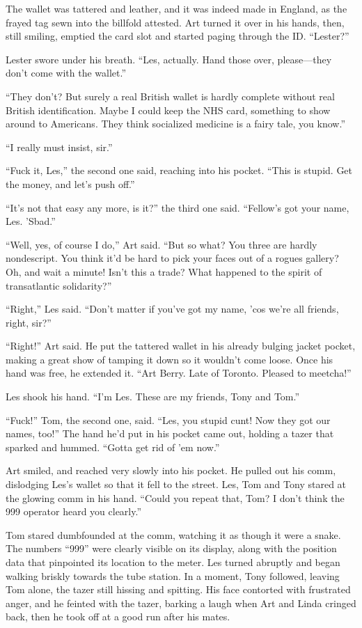 The wallet was tattered and leather, and it was indeed made in
England, as the frayed tag sewn into the billfold attested. Art
turned it over in his hands, then, still smiling, emptied the card
slot and started paging through the ID. “Lester?”

Lester swore under his breath. “Les, actually. Hand those over,
please—they don’t come with the wallet.”

“They don’t? But surely a real British wallet is hardly complete
without real British identification. Maybe I could keep the NHS
card, something to show around to Americans. They think socialized
medicine is a fairy tale, you know.”

“I really must insist, sir.”

“Fuck it, Les,” the second one said, reaching into his pocket.
“This is stupid. Get the money, and let’s push off.”

“It’s not that easy any more, is it?” the third one said. “Fellow’s
got your name, Les. ’Sbad.”

“Well, yes, of course I do,” Art said. “But so what? You three are
hardly nondescript. You think it’d be hard to pick your faces out
of a rogues gallery? Oh, and wait a minute! Isn’t this a trade?
What happened to the spirit of transatlantic solidarity?”

“Right,” Les said. “Don’t matter if you’ve got my name, ’cos we’re
all friends, right, sir?”

“Right!” Art said. He put the tattered wallet in his already
bulging jacket pocket, making a great show of tamping it down so it
wouldn’t come loose. Once his hand was free, he extended it. “Art
Berry. Late of Toronto. Pleased to meetcha!”

Les shook his hand. “I’m Les. These are my friends, Tony and Tom.”

“Fuck!” Tom, the second one, said. “Les, you stupid cunt! Now they
got our names, too!” The hand he’d put in his pocket came out,
holding a tazer that sparked and hummed. “Gotta get rid of ’em
now.”

Art smiled, and reached very slowly into his pocket. He pulled out
his comm, dislodging Les’s wallet so that it fell to the street.
Les, Tom and Tony stared at the glowing comm in his hand. “Could
you repeat that, Tom? I don’t think the 999 operator heard you
clearly.”

Tom stared dumbfounded at the comm, watching it as though it were a
snake. The numbers “999” were clearly visible on its display, along
with the position data that pinpointed its location to the meter.
Les turned abruptly and began walking briskly towards the tube
station. In a moment, Tony followed, leaving Tom alone, the tazer
still hissing and spitting. His face contorted with frustrated
anger, and he feinted with the tazer, barking a laugh when Art and
Linda cringed back, then he took off at a good run after his
mates.

